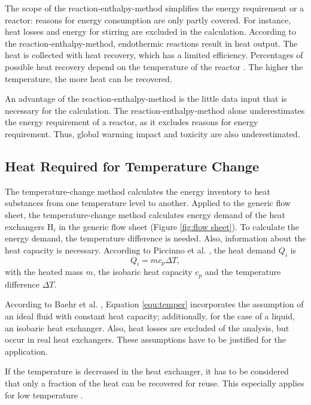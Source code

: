 The scope of the reaction-enthalpy-method simplifies the energy requirement or a reactor: reasons for energy consumption are only partly covered. For instance, heat losses and energy for stirring are excluded in the calculation. According to the reaction-enthalpy-method, endothermic reactions result in heat output. The heat is collected with heat recovery, which has a limited efficiency. Percentages of possible heat recovery depend on the temperature of the reactor  \cite{JimenezGonzalez.2000,Branan.2002}. The higher the temperature, the more heat can be recovered.%

An advantage of the reaction-enthalpy-method is the little data input that is necessary for the calculation. The reaction-enthalpy-method alone underestimates the energy requirement of a reactor, as it excludes reasons for energy requirement. Thus, global warming impact and toxicity are also underestimated.

\subsection{Heat Required for Temperature Change}
\label{heatup}
The  temperature-change method calculates the energy inventory to heat substances from one temperature level to another.  Applied to the generic flow sheet, the temperature-change method calculates energy demand of the heat exchangers H$_i$ in the generic flow sheet (Figure \ref{fig:flow sheet}). To calculate the energy demand, the temperature difference is needed. Also, information about the heat capacity is necessary. According to Piccinno et al. \cite{Piccinno.2016}, the heat demand $Q_i$ is 
\begin{equation}
\label{equ:temper}
    Q_i=mc_p\Delta T,
\end{equation}
with the heated mass $m$, the isobaric heat capacity $c_p$ and the temperature difference $\Delta T$.

According to Baehr et al. \cite{Baehr.2016}, Equation \ref{equ:temper} incorporates the assumption of an ideal fluid with constant heat capacity; additionally, for the case of a liquid, an isobaric heat exchanger. Also, heat losses are excluded of the analysis, but occur in real heat exchangers. These assumptions have to be justified for the application.

If the temperature is decreased in the heat exchanger, it has to be considered that only a fraction of the heat can be recovered for reuse. This especially applies for low temperature  \cite{JimenezGonzalez.2000,Branan.2002}.

